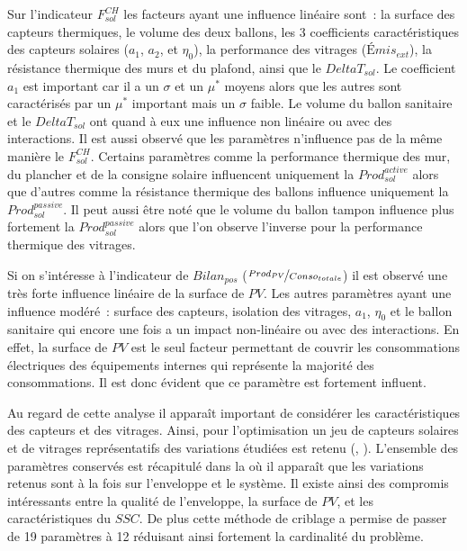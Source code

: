 Sur l’indicateur $F_{sol}^{CH}$ les facteurs ayant une influence linéaire sont~: la
surface des capteurs thermiques, le volume des deux ballons, les \num{3} coefficients
caractéristiques des capteurs solaires ($a_{1}$, $a_{2}$, et $\eta_{0}$), la performance
des vitrages ($Émis_{ext}$), la résistance thermique des murs et du plafond, ainsi que le
$DeltaT_{sol}$. Le coefficient $a_{1}$ est important car il a un $\sigma$ et un $\mu^{*}$
moyens alors que les autres sont caractérisés par un $\mu^{*}$ important mais un $\sigma$
faible. Le volume du ballon sanitaire et le $DeltaT_{sol}$ ont quand à eux une influence
non linéaire ou avec des interactions.
Il est aussi observé que les paramètres n’influence pas de la même manière le $F_{sol}^{CH}$.
Certains paramètres comme la performance thermique des mur, du plancher et de la consigne solaire
influencent uniquement la $Prod_{sol}^{active}$ alors que
d’autres comme la résistance thermique des ballons influence uniquement la $Prod_{sol}^{passive}$.
Il peut aussi être noté que le volume du ballon tampon influence plus fortement la
$Prod_{sol}^{passive}$ alors que l’on observe l’inverse pour la performance thermique
des vitrages.


Si on s’intéresse à l’indicateur de $Bilan_{pos}$ ($\nicefrac{Prod_{PV}}{Conso_{totale}}$)
il est observé une très forte influence linéaire de la surface de $PV$. Les autres paramètres
ayant une influence modéré~: surface des capteurs, isolation des vitrages, $a_{1}$, $\eta_{0}$
et le ballon sanitaire qui encore une fois a un impact non-linéaire ou avec des interactions.
En effet, la surface de $PV$ est le seul facteur permettant de couvrir les consommations
électriques des équipements internes qui représente la majorité des consommations. Il est donc
évident que ce paramètre est fortement influent.


Au regard de cette analyse il apparaît important de considérer les caractéristiques des capteurs et
des vitrages. Ainsi, pour l’optimisation un jeu de capteurs solaires et de vitrages représentatifs
des variations étudiées est retenu (, ).
L’ensemble des paramètres conservés est récapitulé dans la  où il
apparaît que les variations retenus sont à la fois sur l’enveloppe et le système.
Il existe ainsi des compromis intéressants entre la qualité de l’enveloppe, la surface de $PV$, et
les caractéristiques du $SSC$. De plus cette méthode de criblage a permise de passer de
\num{19} paramètres à \num{12} réduisant ainsi fortement la cardinalité du problème.




